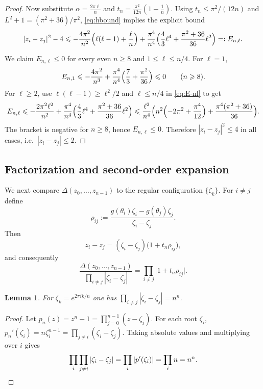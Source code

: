 \documentclass{article}
\newtheorem{lem}[thr]{Lemma}
\theoremstyle{definition}
\let\le\leqslant
\let\ge\geqslant
\begin{document}
\begin{proof}
Now substitute $\alpha=\frac{2\pi\ell}{n}$ and $t_n=\frac{\pi^2}{12n}(1-\frac1n)$.
Using $t_n\le \pi^2/(12n)$ and $L^2+1=(\pi^2+36)/\pi^2$, \eqref{eq:hbound} implies the explicit bound
\begin{equation}\label{eq:E-nl}
|z_i-z_j|^2-4
\le
-\frac{4\pi^2}{n^2}\Bigl(\ell(\ell-1)+\frac{\ell}{n}\Bigr)
+\frac{\pi^4}{n^4}\Bigl(\frac{4}{3}\ell^4+\frac{\pi^2+36}{36}\ell^2\Bigr)
=:E_{n,\ell}.
\end{equation}

We claim $E_{n,\ell}\le0$ for every even $n\ge8$ and $1\le \ell\le n/4$.
For $\ell=1$,
\[
E_{n,1}\le -\frac{4\pi^2}{n^3}
+\frac{\pi^4}{n^4}\Bigl(\frac{7}{3}+\frac{\pi^2}{36}\Bigr)\le 0
\qquad (n\ge 8).
\]
For $\ell\ge2$, use $\ell(\ell-1)\ge \ell^2/2$ and $\ell\le n/4$ in \eqref{eq:E-nl} to get
\[
E_{n,\ell}
\le
-\frac{2\pi^2\ell^2}{n^2}
+\frac{\pi^4}{n^4}\Bigl(\frac{4}{3}\ell^4+\frac{\pi^2+36}{36}\ell^2\Bigr)
\le
\frac{\ell^2}{n^4}\Bigl(n^2\Bigl(-2\pi^2+\frac{\pi^4}{12}\Bigr)+\frac{\pi^4(\pi^2+36)}{36}\Bigr).
\]
The bracket is negative for $n\ge 8$, hence $E_{n,\ell}\le0$.
Therefore $|z_i-z_j|^2\le 4$ in all cases, i.e.\ $|z_i-z_j|\le2$.
\end{proof}

\subsection{Factorization and second-order expansion}
We next compare $\Delta(z_0,\dots,z_{n-1})$ to the regular configuration $\{\zeta_k\}$.
For $i\neq j$ define
\[
\rho_{ij}:=\frac{g(\theta_i)\zeta_i-g(\theta_j)\zeta_j}{\zeta_i-\zeta_j}.
\]
Then
\[
z_i-z_j=(\zeta_i-\zeta_j)\bigl(1+t_n\rho_{ij}\bigr),
\]
and consequently
\begin{equation}\label{eq:factor}
\frac{\Delta(z_0,\dots,z_{n-1})}{\prod_{i\neq j}|\zeta_i-\zeta_j|}
=
\prod_{i\neq j}\bigl|1+t_n\rho_{ij}\bigr|.
\end{equation}

\begin{lem}\label{lem:rootsV}
For $\zeta_k=e^{2\pi i k/n}$ one has \(\prod_{i\neq j}|\zeta_i-\zeta_j|=n^n\).
\end{lem}

\begin{proof}
Let $p_n(z)=z^n-1=\prod_{j=0}^{n-1}(z-\zeta_j)$. For each root $\zeta_i$,
\(
p_n'(\zeta_i)=n\zeta_i^{n-1}=\prod_{j\neq i}(\zeta_i-\zeta_j).
\)
Taking absolute values and multiplying over $i$ gives
\[
\prod_{i}\prod_{j\neq i}|\zeta_i-\zeta_j|
=\prod_i |p'(\zeta_i)|
=\prod_i n = n^n.
\qedhere
\]
\end{proof}
\end{document}
